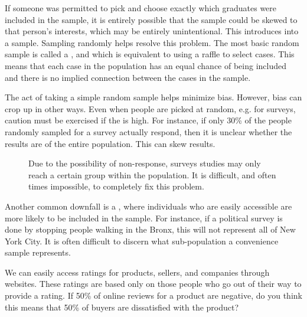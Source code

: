 If someone was permitted to pick and choose exactly which graduates were included in the sample, it is entirely possible that the sample could be skewed to that person's interests, which may be entirely unintentional. This introduces  into a sample. Sampling randomly helps resolve this problem. The most basic random sample is called a , and which is equivalent to using a raffle to select cases. This means that each case in the population has an equal chance of being included and there is no implied connection between the cases in the sample.

The act of taking a simple random sample helps minimize bias. However, bias can crop up in other ways.
Even when people are picked at random, e.g. for surveys, caution must be exercised if the   is high. For instance, if only 30\% of the people randomly sampled for a survey actually respond, then it is unclear whether the results are  of the entire population. This   can skew results.

\begin{figure}[h]
  \centering
  \caption{Due to the possibility of non-response,
      surveys studies may only reach a certain group
      within the population.
      It is difficult, and often times impossible,
      to completely fix this problem.}
  \label{surveySample}
\end{figure}

Another common downfall is a , where individuals who are easily accessible are more likely to be included in the sample. For instance, if a political survey is done by stopping people walking in the Bronx, this will not represent all of New York City. It is often difficult to discern what sub-population a convenience sample represents.

\begin{exercisewrap}
\begin{nexercise}
We can easily access ratings for products, sellers, and companies through websites. These ratings are based only on those people who go out of their way to provide a rating. If 50\% of online reviews for a product are negative, do you think this means that 50\% of buyers are dissatisfied with the product?\footnotemark
\end{nexercise}
\end{exercisewrap}

